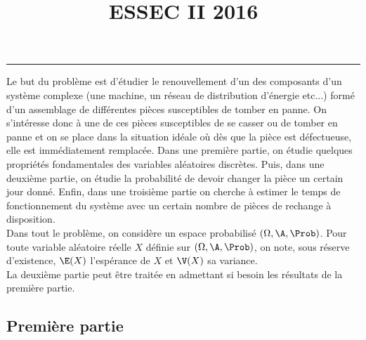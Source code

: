 \documentclass[11pt]{article}%
\title{\bf \vspace{-2cm} ESSEC II 2016} %
\author{} %
\date{} %
\begin{document}
\maketitle %
\vspace{-1.4cm}\hrule %
\thispagestyle{fancy}

\vspace*{.2cm}


\noindent
Le but du problème est d'étudier le renouvellement d'un des composants 
d'un système complexe (une machine, un réseau de distribution d'énergie 
etc...) formé d'un assemblage de différentes pièces susceptibles de 
tomber en panne. On s'intéresse donc à une de ces pièces susceptibles de 
se casser ou de tomber en panne et on se place dans la situation idéale 
où dès que la pièce est défectueuse, elle est immédiatement remplacée. 
Dans une première partie, on étudie quelques propriétés fondamentales 
des variables aléatoires discrètes. Puis, dans une deuxième partie, on 
étudie la probabilité de devoir changer la pièce un certain jour donné. 
Enfin, dans une troisième partie on cherche à estimer le temps de 
fonctionnement du système avec un certain nombre de pièces de rechange à 
disposition.\\
Dans tout le problème, on considère un espace probabilisé $(\Omega, 
\A, \Prob)$. Pour toute variable aléatoire réelle $X$ définie sur 
$(\Omega, \A, \Prob)$, on note, sous réserve d'existence, $\E(X)$ 
l'espérance de $X$ et $\V(X)$ sa variance.\\
La deuxième partie peut être traitée en admettant si besoin les 
résultats de la première partie.

\subsection*{Première partie}
\end{document}
